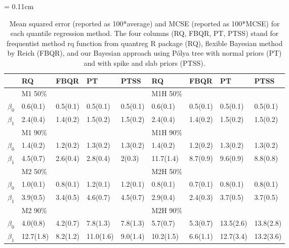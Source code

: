 \documentclass[12pt]{article}
\newcommand{\polya}{P\'{o}lya}
\begin{document}
\begin{center}
  \begin{table}[h]
    \centering
    \caption[]{ Mean squared error (reported as 100*average) and MCSE
      (reported as 100*MCSE) for each
      quantile regression method.   The four
      columns (RQ, FBQR,
      PT, PTSS) stand for frequentist method rq function from
      quantreg R package (RQ), flexible Bayesian method by Reich (FBQR), and
      our Bayesian approach using \polya{} tree with normal priors (PT) and with
      spike and slab priors (PTSS).}
    \vspace{4mm}
    \tabcolsep = 0.11cm
    \begin{tabular}[tb]{cllllllll}
  \hline
          & RQ        & FBQR      & PT        & PTSS      & RQ        & FBQR      & PT        & PTSS      \\
      \hline
          & M1 50\%   &           &           &           & M1H 50\%  &           &           &           \\
$\beta_0$ & 0.6(0.1)  & 0.5(0.1)  & 0.5(0.1)  & 0.5(0.1)  & 0.6(0.1)  & 0.5(0.1)  & 0.5(0.1)  & 0.5(0.1)  \\
$\beta_1$ & 2.4(0.4)  & 1.4(0.2)  & 1.5(0.2)  & 1.5(0.2)  & 2.4(0.4)  & 1.4(0.2)  & 1.5(0.2)  & 1.5(0.2)  \\
          & M1 90\%   &           &           &           & M1H 90\%  &           &           &           \\
$\beta_0$ & 1.4(0.2)  & 1.2(0.2)  & 1.3(0.2)  & 1.3(0.2)  & 1.4(0.2)  & 1.2(0.2)  & 1.3(0.2)  & 1.3(0.2)  \\
$\beta_1$ & 4.5(0.7)  & 2.6(0.4)  & 2.8(0.4)  & 2(0.3)    & 11.7(1.4) & 8.7(0.9)  & 9.6(0.9)  & 8.8(0.8)  \\
          & M2 50\%   &           &           &           & M2H 50\%  &           &           &           \\
$\beta_0$ & 1.0(0.1)  & 0.8(0.1)  & 1.2(0.1)  & 1.2(0.1)  & 0.8(0.1)  & 0.7(0.1)  & 0.8(0.1)  & 0.8(0.1)  \\
$\beta_1$ & 3.9(0.5)  & 3.4(0.5)  & 4.6(0.7)  & 4.5(0.7)  & 2.9(0.4)  & 2.4(0.3)  & 3.7(0.5)  & 3.7(0.5)  \\
          & M2 90\%   &           &           &           & M2H 90\%  &           &           &           \\
$\beta_0$ & 4.0(0.8)  & 4.2(0.7)  & 7.8(1.3)  & 7.8(1.3)  & 5.7(0.7)  & 5.3(0.7)  & 13.5(2.6) & 13.8(2.8) \\
$\beta_1$ & 12.7(1.8) & 8.2(1.2)  & 11.0(1.6) & 9.0(1.4)  & 10.2(1.5) & 6.6(1.1)  & 12.7(3.4) & 13.2(3.6) \\

\end{tabular}
\end{table}
\end{center}
\end{document}
